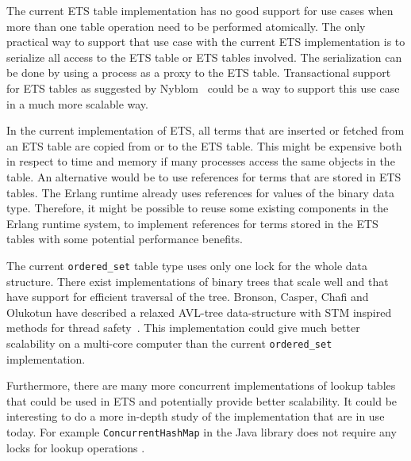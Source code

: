 \documentclass[aps,pre,preprint,nofootinbib]{revtex4}
\begin{document}
The current ETS table implementation has no good support for use cases when more than one table operation need to be performed atomically.
The only practical way to support that use case with the current ETS implementation is to serialize all access to the ETS table or ETS tables involved.
The serialization can be done by using a process as a proxy to the ETS table.
Transactional support for ETS tables as suggested by Nyblom~\cite{PatrikErlangTrans} could be a way to support this use case in a much more scalable way.

In the current implementation of ETS, all terms that are inserted or fetched from an ETS table are copied from or to the ETS table.
This might be expensive both in respect to time and memory if many processes access the same objects in the table.
An alternative would be to use references for terms that are stored in ETS tables.
The Erlang runtime already uses references for values of the binary data type.
Therefore, it might be possible to reuse some existing components in the Erlang runtime system, to implement references for terms stored in the ETS tables with some potential performance benefits.

The current \verb|ordered_set| table type uses only one lock for the whole data structure.
There exist implementations of binary trees that scale well and that have support for efficient traversal of the tree.
Bronson, Casper, Chafi and Olukotun have described a relaxed AVL-tree data-structure with STM inspired methods for thread safety~\cite{BronsonPracTree}.
This implementation could give much better scalability on a multi-core computer than the current \verb|ordered_set| implementation.

Furthermore, there are many more concurrent implementations of lookup tables that could be used in ETS and potentially provide better scalability.
It could be interesting to do a more in-depth study of the implementation that are in use today.
For example \verb|ConcurrentHashMap| in the Java library does not require any locks for lookup operations \cite{BrianConcHashMap}.




\end{document}
